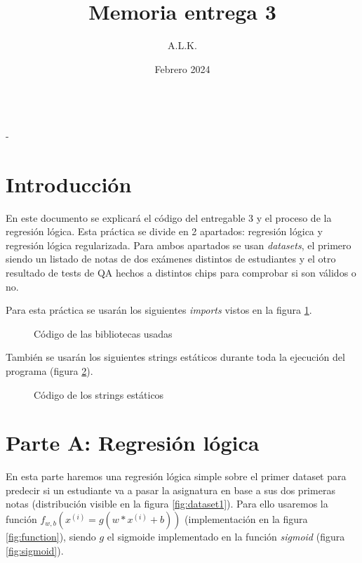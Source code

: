 \documentclass[6pt]{../../shared/AiTex}
\title{Memoria entrega 3}
\author{A.L.K.}
\date{Febrero 2024}
\begin{document}
\justify

\begin{center}

    {\huge \textbf{\underline{\subtitulo}}} \\
    { \lesson - \autor}

\end{center}


\section*{Introducción}

En este documento se explicará el código del entregable 3 y el proceso de la regresión lógica. Esta práctica se divide en 2 apartados: regresión lógica y regresión lógica regularizada. Para ambos apartados se usan \textit{datasets}, el primero siendo un listado de notas de dos exámenes distintos de estudiantes y el otro resultado de tests de QA hechos a distintos chips para comprobar si son válidos o no.

Para esta práctica se usarán los siguientes \textit{imports} vistos en la figura \ref{fig:imports}.

\begin{figure}[H]
    \centering
    
    \caption{Código de las bibliotecas usadas}
    \label{fig:imports}
\end{figure}

También se usarán los siguientes strings estáticos durante toda la ejecución del programa (figura \ref{fig:strings}).

\begin{figure}[H]
    \centering
    
    \caption{Código de los strings estáticos}
    \label{fig:strings}
\end{figure}

\section{Parte A: Regresión lógica}

En esta parte haremos una regresión lógica simple sobre el primer dataset para predecir si un estudiante va a pasar la asignatura en base a sus dos primeras notas (distribución visible en la figura \ref{fig:dataset1}). Para ello usaremos la función $f_{w,b}(x^{(i)} = g(w * x^{(i)} +b))$ (implementación en la figura \ref{fig:function}), siendo $g$ el sigmoide implementado en la función \textit{sigmoid} (figura \ref{fig:sigmoid}).
\end{document}
